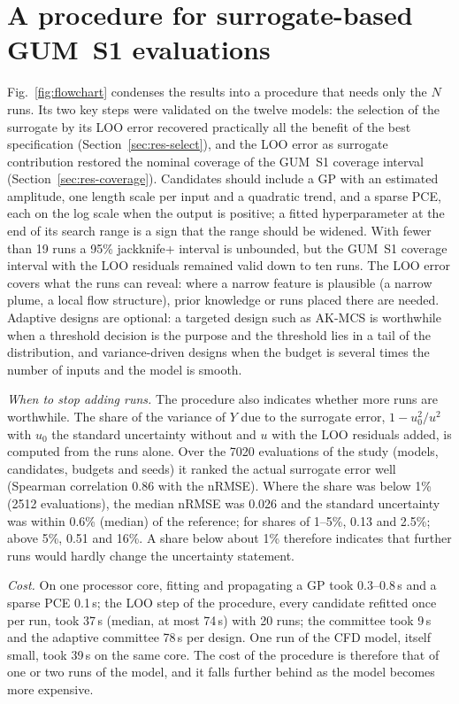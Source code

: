 \section{A procedure for surrogate-based GUM~S1 evaluations}
\label{sec:procedure}
Fig.~\ref{fig:flowchart} condenses the results into a procedure that needs
only the $N$ runs. Its two key steps were validated on the twelve models: the
selection of the surrogate by its LOO error recovered practically all the
benefit of the best specification (Section~\ref{sec:res-select}), and the
LOO error as surrogate contribution restored the nominal coverage of the
GUM~S1 coverage interval (Section~\ref{sec:res-coverage}). Candidates should
include a GP with an estimated amplitude, one length scale per input and a
quadratic trend, and a sparse PCE, each on the log scale when the output
is positive; a fitted hyperparameter at the end of its search range is a
sign that the range should be widened. With fewer than 19 runs a 95\%
jackknife+ interval is unbounded, but the GUM~S1 coverage interval with the
LOO residuals remained valid down to ten runs. The LOO error covers what the
runs can reveal: where a narrow feature is plausible (a narrow plume, a
local flow structure), prior knowledge or runs placed there are needed.
Adaptive designs are optional: a targeted design such as
AK-MCS is worthwhile when a threshold decision is the purpose and the
threshold lies in a tail of the distribution, and
variance-driven designs when the budget is several times the number of
inputs and the model is smooth.

\emph{When to stop adding runs.} The procedure also indicates whether more
runs are worthwhile. The share of the variance of $Y$ due to the surrogate
error, $1-u_0^2/u^2$ with $u_0$ the standard uncertainty without and $u$
with the LOO residuals added, is computed from the runs alone. Over the
7020 evaluations of the study (models, candidates, budgets and seeds) it
ranked the actual surrogate error well (Spearman correlation 0.86 with the
nRMSE). Where the share was below 1\% (2512 evaluations), the median nRMSE
was 0.026 and the standard uncertainty was within 0.6\% (median) of the
reference; for shares of 1--5\%, 0.13 and 2.5\%; above 5\%, 0.51 and 16\%.
A share below about 1\% therefore indicates that further runs would hardly
change the uncertainty statement.

\emph{Cost.} On one processor core, fitting and propagating a GP took
0.3--0.8\,s and a sparse PCE 0.1\,s; the LOO step of the procedure, every
candidate refitted once per run, took 37\,s (median, at most 74\,s) with
20 runs; the committee took 9\,s and the adaptive committee 78\,s per
design. One run of the CFD model, itself small, took 39\,s on the same core.
The cost of the procedure is therefore that of one or two runs of the
model, and it falls further behind as the model becomes more expensive.

